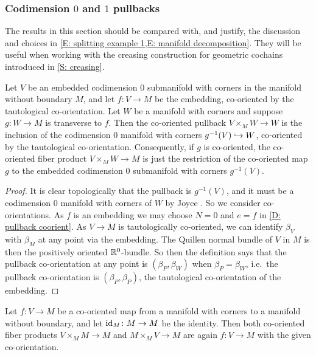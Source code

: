 \subsubsection{Codimension $0$ and $1$ pullbacks}\label{S: codim 0 and 1 co-or}

The results in this section should be compared with, and justify, the discussion and choices in \cref{E: splitting example 1,E: manifold decomposition}.
They will be useful when working with the creasing construction for geometric cochains introduced in \cref{S: creasing}.

\begin{proposition}\label{P: codim 0 pullback}
	Let $V$ be an embedded codimension $0$ submanifold with corners in the manifold without boundary $M$, and let $f \colon V \to M$ be the embedding, co-oriented by the tautological co-orientation.
	Let $W$ be a manifold with corners and suppose $g \colon W \to M$ is transverse to $f$.
	Then the co-oriented pullback $V \times_M W \to W$ is the inclusion of the codimension $0$ manifold with corners $g^{-1}(V) \hookrightarrow W$, co-oriented by the tautological co-orientation.
	Consequently, if $g$ is co-oriented, the co-oriented fiber product $V \times_M W \to M$ is just the restriction of the co-oriented map $g$ to the embedded codimension $0$ submanifold with corners $g^{-1}(V)$.
\end{proposition}

\begin{proof}
	It is clear topologically that the pullback is $g^{-1}(V)$, and it must be a codimension $0$ manifold with corners of $W$ by Joyce \cite[Theorem 6.4]{Joy12}.
	So we consider co-orientations.
	As $f$ is an embedding we may choose $N = 0$ and $e = f$ in \cref{D: pullback coorient}.
	As $V \to M$ is tautologically co-oriented, we can identify $\beta_V$ with $\beta_M$ at any point via the embedding.
	The Quillen normal bundle of $V$ in $M$ is then the positively oriented $\mathbb{R}^0$-bundle.
	So then the definition says that the pullback co-orientation at any point is $(\beta_P, \beta_W)$ when $\beta_P = \beta_W$, i.e.\ the pullback co-orientation is $(\beta_P, \beta_P)$, the tautological co-orientation of the embedding.
\end{proof}

\begin{corollary}\label{C: cup with identity}
	Let $f \colon V \to M$ be a co-oriented map from a manifold with corners to a manifold without boundary, and let $\mathrm{id}_M \colon M \to M$ be the identity.
	Then both co-oriented fiber products $V \times_M M \to M$ and $M \times_M V \to M$ are again $f \colon V \to M$ with the given co-orientation.
\end{corollary}

